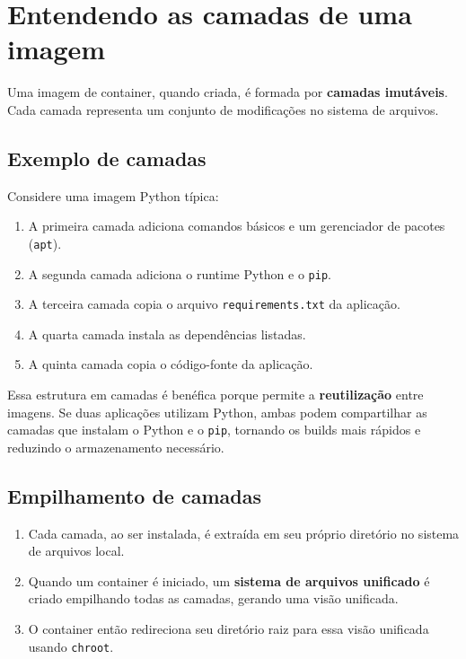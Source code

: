 \section{Entendendo as camadas de uma imagem}

Uma imagem de container, quando criada, é formada por \textbf{camadas imutáveis}. Cada camada representa um conjunto de modificações no sistema de arquivos.

\subsection{Exemplo de camadas}

Considere uma imagem Python típica:

\begin{enumerate}
    \item A primeira camada adiciona comandos básicos e um gerenciador de pacotes (\texttt{apt}).
    \item A segunda camada adiciona o runtime Python e o \texttt{pip}.
    \item A terceira camada copia o arquivo \texttt{requirements.txt} da aplicação.
    \item A quarta camada instala as dependências listadas.
    \item A quinta camada copia o código-fonte da aplicação.
\end{enumerate}

Essa estrutura em camadas é benéfica porque permite a \textbf{reutilização} entre imagens. Se duas aplicações utilizam Python, ambas podem compartilhar as camadas que instalam o Python e o \texttt{pip}, tornando os builds mais rápidos e reduzindo o armazenamento necessário.

\subsection{Empilhamento de camadas}

\begin{enumerate}
    \item Cada camada, ao ser instalada, é extraída em seu próprio diretório no sistema de arquivos local.
    \item Quando um container é iniciado, um \textbf{sistema de arquivos unificado} é criado empilhando todas as camadas, gerando uma visão unificada.
    \item O container então redireciona seu diretório raiz para essa visão unificada usando \texttt{chroot}.
\end{enumerate}

